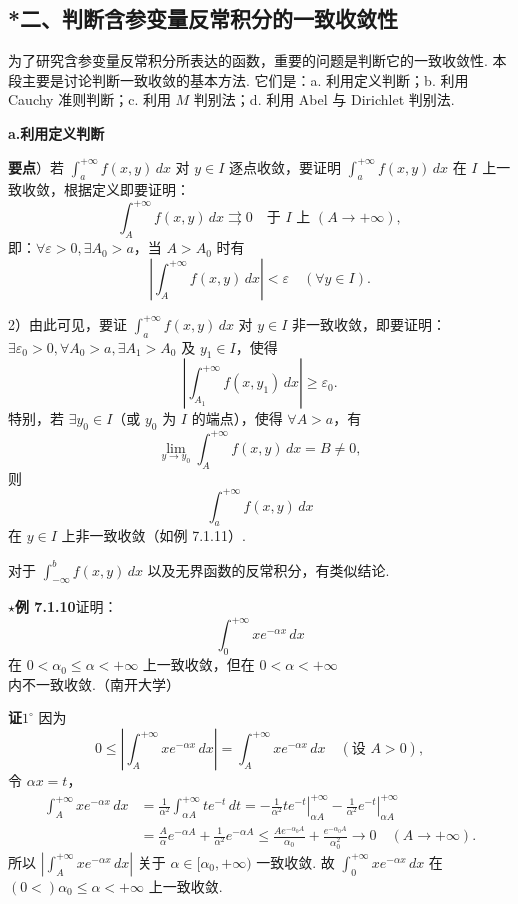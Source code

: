 \documentclass[UTF8,12pt,a4paper,fontset=fandol]{ctexart}
\begin{document}
\subsection*{*二、判断含参变量反常积分的一致收敛性}

为了研究含参变量反常积分所表达的函数，重要的问题是判断它的一致收敛性. 本段主要是讨论判断一致收敛的基本方法. 它们是：a. 利用定义判断；b. 利用 Cauchy 准则判断；c. 利用 $M$ 判别法；d. 利用 Abel 与 Dirichlet 判别法.

\noindent\textbf{a.\quad 利用定义判断}

\noindent\textbf{要点}）若 $\displaystyle\int_a^{+\infty}f(x,y)\,dx$ 对 $y\in I$ 逐点收敛，要证明 $\displaystyle\int_a^{+\infty}f(x,y)\,dx$ 在 $I$ 上一致收敛，根据定义即要证明：
\[
\int_A^{+\infty}f(x,y)\,dx\rightrightarrows0\quad\text{于 }I\text{ 上 }(A\to+\infty),
\]
即：$\forall\varepsilon>0,\exists A_0>a$，当 $A>A_0$ 时有
\[
\left|\int_A^{+\infty}f(x,y)\,dx\right|<\varepsilon\quad(\forall y\in I).
\]

2）由此可见，要证 $\displaystyle\int_a^{+\infty}f(x,y)\,dx$ 对 $y\in I$ 非一致收敛，即要证明：$\exists\varepsilon_0>0,\forall A_0>a,\exists A_1>A_0$ 及 $y_1\in I$，使得
\[
\left|\int_{A_1}^{+\infty}f(x,y_1)\,dx\right|\ge\varepsilon_0.
\]
特别，若 $\exists y_0\in I$（或 $y_0$ 为 $I$ 的端点），使得 $\forall A>a$，有
\[
\lim_{y\to y_0}\int_A^{+\infty}f(x,y)\,dx=B\ne0,
\]
则
\[
\int_a^{+\infty}f(x,y)\,dx
\]
在 $y\in I$ 上非一致收敛（如例 7.1.11）.

对于 $\displaystyle\int_{-\infty}^b f(x,y)\,dx$ 以及无界函数的反常积分，有类似结论.

\noindent\textbf{$\star$例 7.1.10}\quad 证明：
\[
\int_0^{+\infty}xe^{-\alpha x}\,dx
\]
在 $0<\alpha_0\le\alpha<+\infty$ 上一致收敛，但在 $0<\alpha<+\infty$ 内不一致收敛.（南开大学）

\noindent\textbf{证}\quad $1^\circ$ 因为
\[
0\le\left|\int_A^{+\infty}xe^{-\alpha x}\,dx\right|
=\int_A^{+\infty}xe^{-\alpha x}\,dx\quad(\text{设 }A>0),
\]
令 $\alpha x=t$，
\[
\begin{aligned}
\int_A^{+\infty}xe^{-\alpha x}\,dx
&=\frac1{\alpha^2}\int_{\alpha A}^{+\infty}te^{-t}\,dt
=-\left.\frac1{\alpha^2}te^{-t}\right|_{\alpha A}^{+\infty}
-\left.\frac1{\alpha^2}e^{-t}\right|_{\alpha A}^{+\infty}\\
&=\frac{A}{\alpha}e^{-\alpha A}
+\frac1{\alpha^2}e^{-\alpha A}
\le\frac{Ae^{-\alpha_0A}}{\alpha_0}
+\frac{e^{-\alpha_0A}}{\alpha_0^2}\to0\quad(A\to+\infty).
\end{aligned}
\]
所以 $\left|\displaystyle\int_A^{+\infty}xe^{-\alpha x}\,dx\right|$ 关于 $\alpha\in[\alpha_0,+\infty)$ 一致收敛. 故 $\displaystyle\int_0^{+\infty}xe^{-\alpha x}\,dx$ 在 $(0<)\alpha_0\le\alpha<+\infty$ 上一致收敛.
\end{document}
